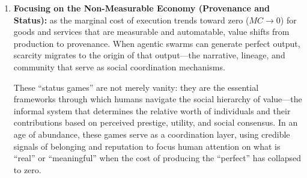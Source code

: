 \documentclass[12pt, letter]{article}
\begin{document}
\begin{enumerate}
    \begin{itemize}
    
    \item \textbf{Constraint Architecture:} translating vague goals into high-fidelity operational constraints—defining not just what the swarm should do, but the ``no-go'' zones and the hierarchy of trade-offs when objectives conflict.
    
    \item \textbf{Verification and Drift Detection:} identifying the subtle divergence between proxy optimization and true intent (detecting where $m_A > m_H$). This is the ability to perceive when a result is technically correct but contextually off.

  
    \item \textbf{Preference Arbitration:} negotiating among stakeholders to synthesize conflicting, non-measurable requirements into a coherent, steerable objective function ($U$).
    
    \item \textbf{Liability Underwriting:} serving as the named party responsible for outcomes over long horizons ($t_{fb}$). The human provides the ``skin in the game'', licensure or fiduciary responsibility that capital and energy cannot.
    
    \item \textbf{Intervention Logic:} knowing when to take over. The orchestrator must identify the limits of the agent's world model and step in during out-of-distribution events.
    
    \end{itemize}


\item \textbf{Focusing on the Non-Measurable Economy (Provenance and Status):} as the marginal cost of execution trends toward zero ($MC \to 0$) for goods and services that are measurable and automatable, value shifts from production to provenance. When agentic swarms can generate perfect output, scarcity migrates to the origin of that output—the narrative, lineage, and community that serve as social coordination mechanisms. 

These ``status games'' are not merely vanity: they are the essential frameworks through which humans navigate the social hierarchy of value—the informal system that determines the relative worth of individuals and their contributions based on perceived prestige, utility, and social consensus. In an age of abundance, these games serve as a coordination layer, using credible signals of belonging and reputation to focus human attention on what is ``real'' or ``meaningful'' when the cost of producing the ``perfect'' has collapsed to zero.


\end{enumerate}
\end{document}
